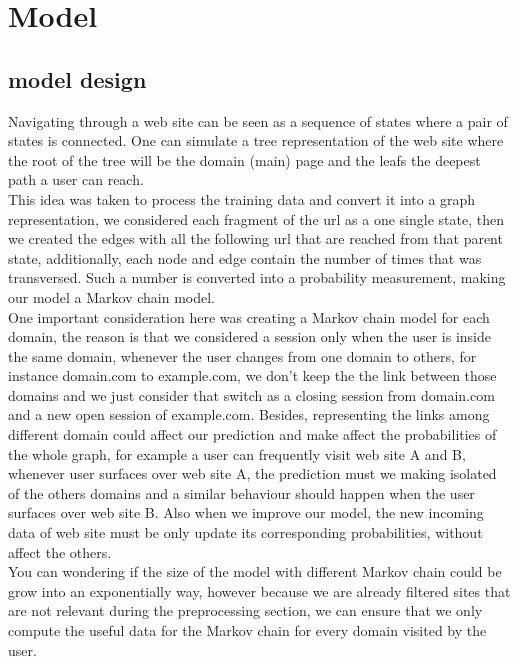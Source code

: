 \section{Model}\label{sec:models}

\subsection{model design}\label{subsec:model_design}

Navigating through a web site can be seen as a sequence of states where a pair of states is connected. One can simulate a tree representation of the web site where the root of the tree will be the domain (main) page and the leafs the deepest path a user can reach.
\\[2ex]
This idea was taken to process the training data and convert it into a graph representation, we considered each fragment of the url as a one single state, then we created the edges with all the following url that are reached from that parent state, additionally, each node and edge contain the number of times that was transversed.  Such a number is converted into a probability measurement, making our model a Markov chain model.
\\[2ex]
One important consideration here was creating a Markov chain model for each domain, the reason is that we considered a session only when the user is inside the same domain, whenever the user changes from one domain to others, for instance domain.com to example.com, we don’t keep the the link between those domains and we just consider that switch as a closing session from domain.com and a new open session of example.com. Besides, representing the links among different domain could affect our prediction and make affect the probabilities of the whole graph, for example a user can frequently visit web site A and B, whenever user surfaces over web site A, the prediction must we making isolated of the others domains and a similar behaviour should happen when the user surfaces over web site B. Also when we improve our model, the new incoming data of web site must be only update its corresponding probabilities, without affect the others.
\\[2ex]
You can wondering if the size of the model with different Markov chain could be grow into an exponentially way, however because we are already filtered sites that are not relevant during the preprocessing section, we can ensure that we only compute the useful data for the Markov chain for every domain visited by the user.
\\[2ex]

